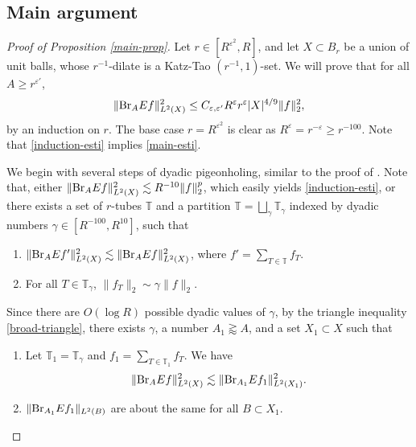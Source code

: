 \documentclass{amsart}
\numberwithin{equation}{section}
\newcommand{\ga}{\gamma}
\newcommand{\e}{\varepsilon}
\newcommand{\ZT}{\mathbb{T}}
\newcommand{\BR}{{\rm{Br}}}
\begin{document}
\medskip

\subsection{Main argument}


\begin{proof}[Proof of Proposition \ref{main-prop}]



Let $r\in[R^{\e^2}, R]$, and let $X\subset B_r$ be a union of unit balls, whose $r^{-1}$-dilate is a Katz-Tao $(r^{-1},1)$-set.
We will prove that for all $A\geq r^{\e'}$,
\begin{equation}
\label{induction-esti}
    \|\BR_A Ef\|_{L^2(X)}^2\leq C_{\e,\e'} R^{\e}r^\e|X|^{4/9}\|f\|_2^2,
\end{equation}
by an induction on $r$.
The base case $r=R^{\e^2}$ is clear as $R^\e=r^{-\e}\geq r^{-100}$.
Note that \eqref{induction-esti} implies \eqref{main-esti}.

\smallskip


We begin with several steps of dyadic pigeonholing, similar to the proof of \cite[Proposition 4.13]{Demeter-Wu}.
Note that, either $ \|\BR_A Ef\|_{L^2(X)}^2\lesssim R^{-10}\|f\|_2^p$, which easily yields \eqref{induction-esti}, or there exists a set of $r$-tubes $\ZT$ and a partition $\ZT=\bigsqcup_{\ga}\ZT_{\ga}$ indexed by dyadic numbers $\ga\in[R^{-100},R^{10}]$, such that
\begin{enumerate}
    \item $ \|\BR_A Ef'\|_{L^2(X)}^2\lesssim  \|\BR_A Ef\|_{L^2(X)}^2$, where $f'=\sum_{T\in\ZT}f_T$.
    \item For all $T\in\ZT_{\ga}$, $\|f_T\|_2\sim \ga\|f\|_2$.
\end{enumerate}
Since there are $O(\log R)$ possible dyadic values of $\ga$, by the triangle inequality \eqref{broad-triangle}, there exists $\ga$, a number $A_1\gtrapprox A$, and a set $X_1\subset X$ such that 
\begin{enumerate}
    \item Let $\ZT_1=\ZT_\ga$ and $f_{1}=\sum_{T\in\ZT_{1}}f_T$. 
    We have
    \begin{equation}
    \label{reduction-0}
        \|\BR_A Ef\|_{L^2(X)}^2\lesssim  \|\BR_{A_1} Ef_1\|_{L^2(X_1)}^2.
    \end{equation}
    \item  $\|\BR_{A_1} Ef_1\|_{L^2(B)}$ are about the same for all $B\subset X_1$.
\end{enumerate}


\end{proof}
\end{document}
